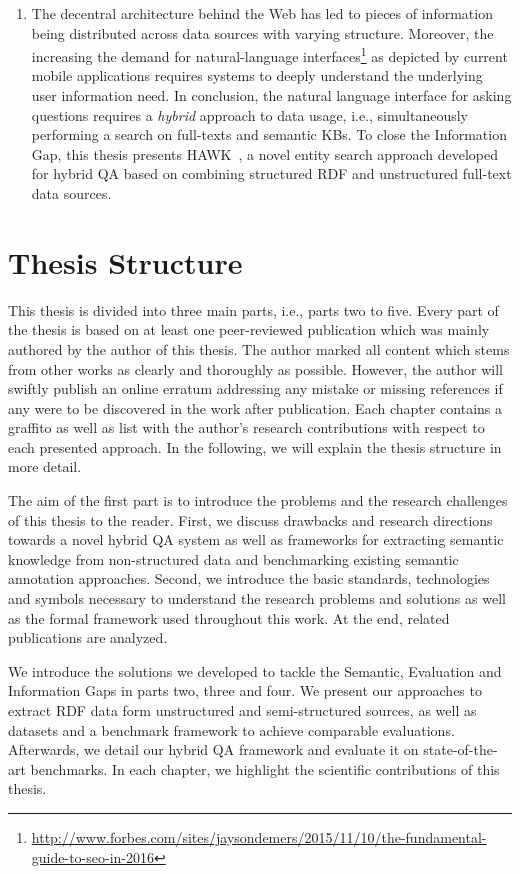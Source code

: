 \begin{enumerate}
\item 
The decentral architecture behind the Web has led to pieces of information being distributed across data sources with varying structure. 
Moreover, the increasing the demand for natural-language interfaces\footnote{\url{http://www.forbes.com/sites/jaysondemers/2015/11/10/the-fundamental-guide-to-seo-in-2016}} as depicted by current mobile applications requires systems to deeply understand the underlying user information need.
In conclusion, the natural language interface for asking questions requires a  \emph{hybrid} approach to data usage, i.e., simultaneously performing a search on full-texts and semantic \ac{KB}s. 
To close the {Information Gap}, this thesis presents HAWK~\cite{hawk_2015}, a novel entity search approach developed for hybrid \ac{QA} based on combining structured \ac{RDF} and unstructured full-text data sources.
\end{enumerate}



\section*{Thesis Structure}

This thesis is divided into three main parts, i.e., parts two to five.
Every part of the thesis is based on at least one peer-reviewed publication which was mainly authored by the author of this thesis.
The author marked all content which stems from other works as clearly and thoroughly as possible. 
However, the author will swiftly publish an online erratum addressing any mistake or missing references if any were to be discovered in the work after publication.
Each chapter contains a graffito as well as list with the author's research contributions with respect to each presented approach.
In the following, we will explain the thesis structure in more detail.

The aim of the first part is to introduce the problems and the research challenges of this thesis to the reader. 
First, we discuss drawbacks and research directions towards a novel hybrid \ac{QA} system as well as frameworks for extracting semantic knowledge from non-structured data and benchmarking existing semantic annotation approaches.
Second, we introduce the basic standards, technologies and symbols necessary to understand the research problems and solutions as well as the formal framework used throughout this work.
At the end, related publications are analyzed.

We introduce the solutions we developed to tackle the Semantic, Evaluation and Information Gaps in parts two, three and four.  
We  present our approaches to extract \ac{RDF} data form unstructured and semi-structured sources, as well as datasets and a benchmark framework to achieve comparable evaluations. 
Afterwards, we detail our hybrid \ac{QA} framework and evaluate it on state-of-the-art benchmarks.
In each chapter, we highlight the scientific contributions of this thesis.

